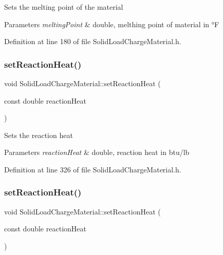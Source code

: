 Sets the melting point of the material 
\begin{DoxyParams}{Parameters}
{\em melting\+Point} & double, melthing point of material in °F \\
\hline
\end{DoxyParams}


Definition at line 180 of file Solid\+Load\+Charge\+Material.\+h.

\mbox{\label{class_solid_load_charge_material_a9c3cd28b2b31fb66eea984d9030cd247}} 
\subsubsection{\texorpdfstring{set\+Reaction\+Heat()}{setReactionHeat()}\hspace{0.1cm}{\footnotesize\ttfamily [1/3]}}
{\footnotesize\ttfamily void Solid\+Load\+Charge\+Material\+::set\+Reaction\+Heat (\begin{DoxyParamCaption}\item[{const double}]{reaction\+Heat }\end{DoxyParamCaption})\hspace{0.3cm}{\ttfamily [inline]}}

Sets the reaction heat 
\begin{DoxyParams}{Parameters}
{\em reaction\+Heat} & double, reaction heat in btu/lb \\
\hline
\end{DoxyParams}


Definition at line 326 of file Solid\+Load\+Charge\+Material.\+h.

\mbox{\label{class_solid_load_charge_material_a9c3cd28b2b31fb66eea984d9030cd247}} 
\subsubsection{\texorpdfstring{set\+Reaction\+Heat()}{setReactionHeat()}\hspace{0.1cm}{\footnotesize\ttfamily [2/3]}}
{\footnotesize\ttfamily void Solid\+Load\+Charge\+Material\+::set\+Reaction\+Heat (\begin{DoxyParamCaption}\item[{const double}]{reaction\+Heat }\end{DoxyParamCaption})\hspace{0.3cm}{\ttfamily [inline]}}

